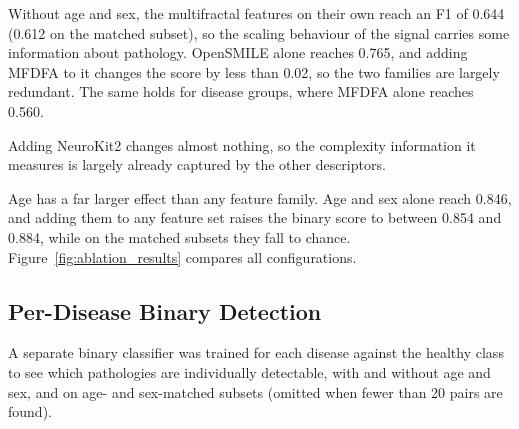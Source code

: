 \documentclass[runningheads]{llncs}
\begin{document}
Without age and sex, the multifractal features on their own reach an F1 of 0.644 (0.612 on the matched subset), so the scaling behaviour of the signal carries some information about pathology. OpenSMILE alone reaches 0.765, and adding MFDFA to it changes the score by less than 0.02, so the two families are largely redundant. The same holds for disease groups, where MFDFA alone reaches 0.560.

Adding NeuroKit2 changes almost nothing, so the complexity information it measures is largely already captured by the other descriptors.

Age has a far larger effect than any feature family. Age and sex alone reach 0.846, and adding them to any feature set raises the binary score to between 0.854 and 0.884, while on the matched subsets they fall to chance. Figure~\ref{fig:ablation_results} compares all configurations.

  \subsection{Per-Disease Binary Detection}

  A separate binary classifier was trained for each disease against the healthy class to see which pathologies are individually detectable, with and without age and sex, and on age- and sex-matched subsets (omitted when fewer than 20 pairs are found).

  \begin{table}[htbp]
  \centering
  \caption{Per-disease binary detection (macro F1, mean $\pm$ SD over five folds). Count of matched pairs per disease in brackets.}
  \label{tab:per_disease}
  \setlength{\tabcolsep}{6pt}
  \end{table}
\end{document}
